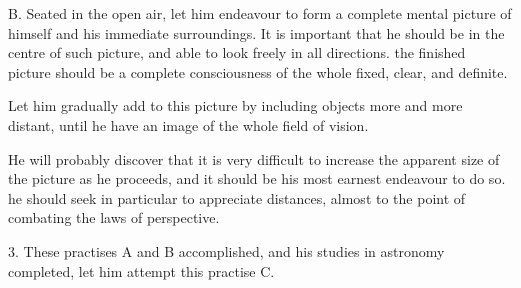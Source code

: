 \begin{quoting}

B. Seated in the open air, let him endeavour to form a complete mental picture of himself and his immediate surroundings. It is important that he should be in the centre of such picture, and able to look freely in all directions. the finished picture should be a complete consciousness of the whole fixed, clear, and definite.

Let him gradually add to this picture by including objects more and more distant, until he have an image of the whole field of vision.
     
He will probably discover that it is very difficult to increase the apparent size of the picture as he proceeds, and it should be his most earnest endeavour to do so. he should seek in particular to appreciate distances, almost to the point of combating the laws of perspective.

\end{quoting}


3. These practises A and B accomplished, and his studies in astronomy completed, let him attempt this practise C.

